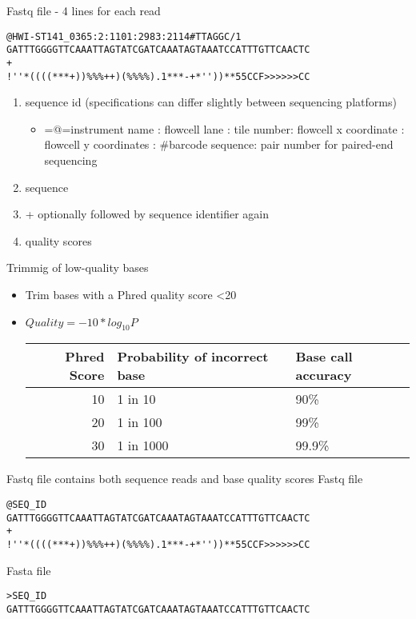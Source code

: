 \documentclass[presentation]{beamer}
\begin{document}
\begin{frame}[fragile,label=sec-2-1-4]{Fastq file - 4 lines for each read}
 \begin{verbatim}
@HWI-ST141_0365:2:1101:2983:2114#TTAGGC/1
GATTTGGGGTTCAAATTAGTATCGATCAAATAGTAAATCCATTTGTTCAACTC
+
!''*((((***+))%%%++)(%%%%).1***-+*''))**55CCF>>>>>>CC
\end{verbatim}

\begin{enumerate}
\item sequence id (specifications can differ slightly between sequencing platforms)
\begin{itemize}
\item =@=instrument name : flowcell lane : tile number: flowcell x coordinate : flowcell y coordinates : \#barcode sequence: pair number for paired-end sequencing
\end{itemize}
\item sequence
\item + optionally followed by sequence identifier again
\item quality scores
\end{enumerate}
\end{frame}



\begin{frame}[label=sec-2-1-5]{Trimmig of low-quality bases}
\begin{itemize}
\item Trim bases with a Phred quality score <20
\item \(Quality=-10*log_{10}{P}\)

\begin{center}
\begin{tabular}{rll}
Phred Score & Probability of incorrect base & Base call accuracy\\
\hline
10 & 1 in 10 & 90\%\\
20 & 1 in 100 & 99\%\\
30 & 1 in 1000 & 99.9\%\\
\end{tabular}
\end{center}
\end{itemize}
\end{frame}


\begin{frame}[fragile,label=sec-2-1-6]{Fastq file contains both sequence reads and base quality scores}
 \alert{Fastq file}

\begin{verbatim}
@SEQ_ID
GATTTGGGGTTCAAATTAGTATCGATCAAATAGTAAATCCATTTGTTCAACTC
+
!''*((((***+))%%%++)(%%%%).1***-+*''))**55CCF>>>>>>CC
\end{verbatim}


\alert{Fasta file}

\begin{verbatim}
>SEQ_ID
GATTTGGGGTTCAAATTAGTATCGATCAAATAGTAAATCCATTTGTTCAACTC
\end{verbatim}
\end{frame}
\end{document}
